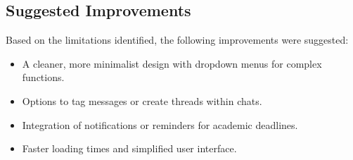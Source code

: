 \documentclass[12pt,a4paper]{article}
\begin{document}
\subsection{Suggested Improvements}
Based on the limitations identified, the following improvements were suggested:
\begin{itemize}
    \item A cleaner, more minimalist design with dropdown menus for complex functions.
    \item Options to tag messages or create threads within chats.
    \item Integration of notifications or reminders for academic deadlines.
    \item Faster loading times and simplified user interface.
\end{itemize}
\end{document}
